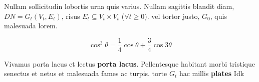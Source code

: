 Nullam sollicitudin lobortis urna quis varius. Nullam sagittis blandit diam, 
$DN = G_t(V_t,E_t)$, risus $E_t \subseteq V_t \times V_t$ ($\forall t \geq 0$). 
vel tortor justo, $G_0$, quis malesuada lorem.

\begin{equation}
\cos^3 \theta =\frac{1}{4}\cos\theta+\frac{3}{4}\cos 3\theta
\label{eq:refname}
\end{equation}

Vivamus porta lacus et lectus \textbf{porta lacus}. Pellentesque habitant morbi 
tristique senectus et netus et malesuada fames ac turpis. torte $G_t$ hac millis 
\textbf{plates} Idk
